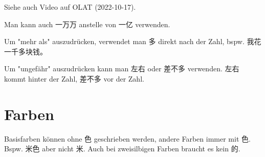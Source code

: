 \documentclass[UTF8]{ctexart}
\begin{document}
Siehe auch Video auf OLAT (2022-10-17).

Man kann auch 一万万 anstelle von 一亿 verwenden.

Um "mehr als" auszudrücken, verwendet man 多 direkt nach der Zahl, bspw. 我花一千多块钱。

Um "ungefähr" auszudrücken kann man 左右 oder 差不多 verwenden. 左右 kommt hinter der Zahl, 差不多 vor der Zahl.

\section{Farben}

Basisfarben können ohne 色 geschrieben werden, andere Farben immer mit 色. Bspw. 米色 aber nicht 米. Auch bei zweisilbigen Farben braucht es kein 的.
\end{document}
